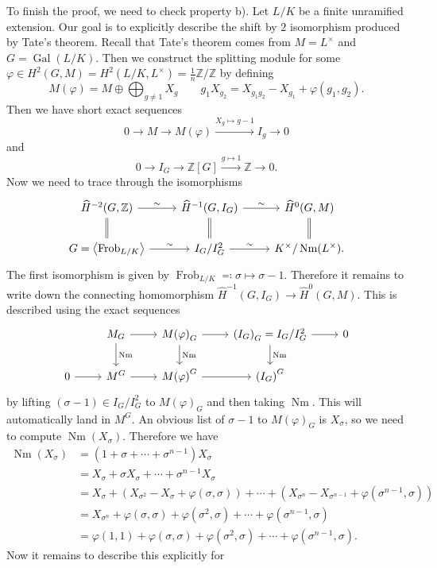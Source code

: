 \documentclass[leqno, openany]{memoir}
\theoremstyle{definition}
\theoremstyle{remark}
\theoremstyle{plain}
\theoremstyle{definition}
\theoremstyle{remark}
\newcommand{\Z}{\mathbb{Z}}
\newcommand{\wh}[1]{\widehat{#1}}
\DeclareMathOperator{\Gal}{Gal}
\DeclareMathOperator{\Nm}{Nm}
\DeclareMathOperator{\Frob}{Frob}
\begin{document}
To finish the proof, we need to check property b). Let $L/K$ be a finite
unramified extension. Our goal is to explicitly describe the shift by $2$
isomorphism produced by Tate's theorem. Recall that Tate's theorem comes from
$M = L^{\times}$ and $G = \Gal(L/K)$. Then we construct the splitting module
for some $\varphi \in H^2(G, M) = H^2(L/K, L^{\times}) = \frac{1}{n} \Z/\Z$ by
defining \[ M(\varphi) = M \oplus \bigoplus_{g \neq 1} X_g \qquad g_1 X_{g_2} =
X_{g_1g_2} - X_{g_1} + \varphi(g_1, g_2). \] Then we have short exact sequences
\[ 0 \to M \to M(\varphi)  \xrightarrow{X_g \mapsto g-1} I_g \to  0 \] and \[ 0
\to I_G \to \Z[G] \xrightarrow{g \mapsto 1} \Z \to 0. \] Now we need to trace
through the isomorphisms \begin{equation*} \begin{tikzcd} \wh{H}^{-2}(G, \Z)
    \ar{r}{\sim} \ar[equal]{d} & \wh{H}^{-1}(G, I_G) \ar{r}{\sim} \ar[equal]{d}
                               & \wh{H}^0(G, M) \ar[equal]{d} \\ G =
    \ev{\Frob_{L/K}} \ar{r}{\sim} & I_G/I_G^2 \ar{r}{\sim} &
    K^{\times}/\Nm(L^{\times}).  \end{tikzcd} \end{equation*} The first
    isomorphism is given by $\Frob_{L/K} \eqqcolon \sigma \mapsto \sigma - 1$.
    Therefore it remains to write down the connecting homomorphism
    $\wh{H}^{-1}(G, I_G) \to \wh{H}^0(G, M)$. This is described using the exact
    sequences \begin{equation*} \begin{tikzcd} & M_G \ar{r} \ar{d}{\Nm} &
    {M(\varphi)}_G \ar{r} \ar{d}{\Nm} & {(I_G)}_G = I_G/I_G^2 \ar{r}
\ar{d}{\Nm} & 0 \\ 0 \ar{r} & M^G \ar{r} & {M(\varphi)}^G \ar{r} & {(I_G)}^G
\end{tikzcd} \end{equation*} by lifting $(\sigma - 1) \in I_G/I_G^2$ to
${M(\varphi)}_G$ and then taking $\Nm$. This will automatically land in $M^G$.
An obvious list of $\sigma - 1$ to ${M(\varphi)}_G$ is $X_{\sigma}$, so we need
to compute $\Nm(X_{\sigma})$. Therefore we have \begin{align*} \Nm(X_{\sigma})
&= (1+ \sigma + \cdots + \sigma^{n-1}) X_{\sigma} \\ &= X_{\sigma} + \sigma
    X_{\sigma} + \cdots + \sigma^{n-1} X_{\sigma} \\ &= X_{\sigma} +
    (X_{\sigma^2}-X_{\sigma}+\varphi(\sigma, \sigma)) + \cdots +
    (X_{\sigma^n}-X_{\sigma^{n-1}}+\varphi(\sigma^{n-1}, \sigma)) \\ &=
    X_{\sigma^n} + \varphi(\sigma, \sigma) + \varphi(\sigma^2, \sigma) + \cdots
    + \varphi(\sigma^{n-1}, \sigma) \\ &= \varphi(1,1) + \varphi(\sigma,
    \sigma) + \varphi(\sigma^2, \sigma) + \cdots + \varphi(\sigma^{n-1},
    \sigma).  \end{align*} Now it remains to describe this explicitly for
\end{document}

